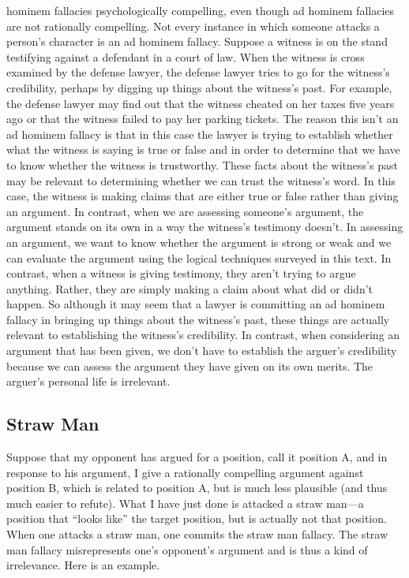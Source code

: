 hominem fallacies psychologically compelling, even though ad hominem
fallacies are not rationally compelling.
Not every instance in which someone attacks a person's character is an ad
hominem fallacy. Suppose a witness is on the stand testifying against a
defendant in a court of law. When the witness is cross examined by the defense
lawyer, the defense lawyer tries to go for the witness's credibility, perhaps by
digging up things about the witness's past. For example, the defense lawyer
may find out that the witness cheated on her taxes five years ago or that the
witness failed to pay her parking tickets. The reason this isn't an ad hominem
fallacy is that in this case the lawyer is trying to establish whether what the
witness is saying is true or false and in order to determine that we have to know
whether the witness is trustworthy. These facts about the witness's past may be
relevant to determining whether we can trust the witness's word. In this case,
the witness is making claims that are either true or false rather than giving an
argument. In contrast, when we are assessing someone's argument, the
argument stands on its own in a way the witness's testimony doesn't. In
assessing an argument, we want to know whether the argument is strong or
weak and we can evaluate the argument using the logical techniques surveyed
in this text. In contrast, when a witness is giving testimony, they aren't trying to
argue anything. Rather, they are simply making a claim about what did or didn't
happen. So although it may seem that a lawyer is committing an ad hominem
fallacy in bringing up things about the witness's past, these things are actually
relevant to establishing the witness's credibility. In contrast, when considering
an argument that has been given, we don't have to establish the arguer's
credibility because we can assess the argument they have given on its own
merits. The arguer's personal life is irrelevant.

\subsection{Straw Man}

Suppose that my opponent has argued for a position, call it position A, and in
response to his argument, I give a rationally compelling argument against
position B, which is related to position A, but is much less plausible (and thus
much easier to refute). What I have just done is attacked a straw man—a
position that ``looks like'' the target position, but is actually not that position.
When one attacks a straw man, one commits the straw man fallacy. The straw
man fallacy misrepresents one's opponent's argument and is thus a kind of
irrelevance. Here is an example.

